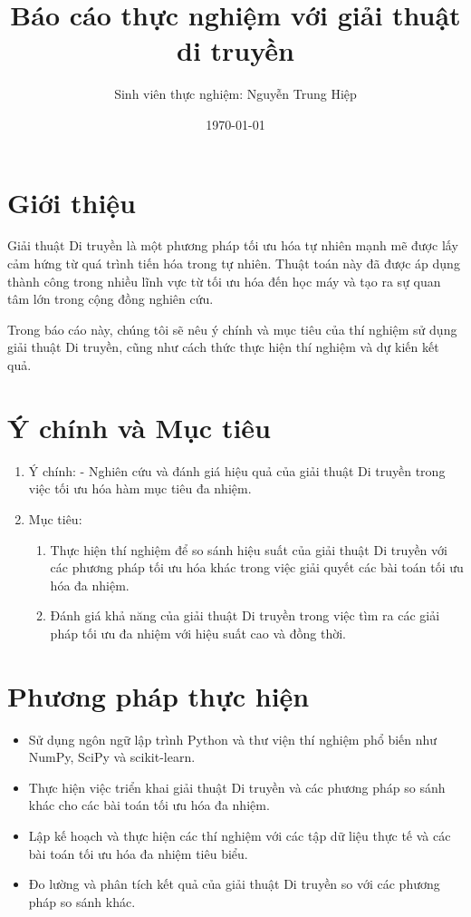 \documentclass{article}
\title{Báo cáo thực nghiệm với giải thuật di truyền}
\author{Sinh viên thực nghiệm: Nguyễn Trung Hiệp}
\date{\today}
\begin{document}
	\maketitle
	
	\section{Giới thiệu}
	
	Giải thuật Di truyền là một phương pháp tối ưu hóa tự nhiên mạnh mẽ được lấy cảm hứng từ quá trình tiến hóa trong tự nhiên. Thuật toán này đã được áp dụng thành công trong nhiều lĩnh vực từ tối ưu hóa đến học máy và tạo ra sự quan tâm lớn trong cộng đồng nghiên cứu.
	
	Trong báo cáo này, chúng tôi sẽ nêu ý chính và mục tiêu của thí nghiệm sử dụng giải thuật Di truyền, cũng như cách thức thực hiện thí nghiệm và dự kiến kết quả.
	
	\section{Ý chính và Mục tiêu}
	
	\begin{enumerate}
		\item Ý chính:
		- Nghiên cứu và đánh giá hiệu quả của giải thuật Di truyền trong việc tối ưu hóa hàm mục tiêu đa nhiệm.
		\item Mục tiêu:
		\begin{enumerate}
			 \item Thực hiện thí nghiệm để so sánh hiệu suất của giải thuật Di truyền với các phương pháp tối ưu hóa khác trong việc giải quyết các bài toán tối ưu hóa đa nhiệm.
			\item Đánh giá khả năng của giải thuật Di truyền trong việc tìm ra các giải pháp tối ưu đa nhiệm với hiệu suất cao và đồng thời.
		\end{enumerate}
	\end{enumerate}

\section{Phương pháp thực hiện}

\begin{itemize}
	\item Sử dụng ngôn ngữ lập trình Python và thư viện thí nghiệm phổ biến như NumPy, SciPy và scikit-learn.
	\item Thực hiện việc triển khai giải thuật Di truyền và các phương pháp so sánh khác cho các bài toán tối ưu hóa đa nhiệm.
	\item Lập kế hoạch và thực hiện các thí nghiệm với các tập dữ liệu thực tế và các bài toán tối ưu hóa đa nhiệm tiêu biểu.
	\item Đo lường và phân tích kết quả của giải thuật Di truyền so với các phương pháp so sánh khác.
\end{itemize}
\end{document}
